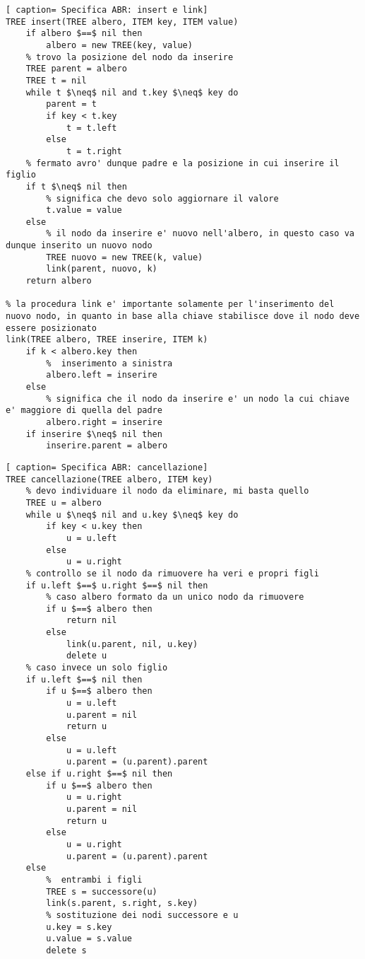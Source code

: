 \documentclass[../cheatSheetAlgoritmi.tex]{subfiles}
\begin{document}
\begin{lstlisting}[ caption= Specifica ABR: insert e link]
TREE insert(TREE albero, ITEM key, ITEM value)
	if albero $==$ nil then
		albero = new TREE(key, value)
	% trovo la posizione del nodo da inserire
	TREE parent = albero
	TREE t = nil
	while t $\neq$ nil and t.key $\neq$ key do
	  	parent = t
		if key < t.key
    		t = t.left
		else 
			t = t.right
	% fermato avro' dunque padre e la posizione in cui inserire il figlio
	if t $\neq$ nil then
		% significa che devo solo aggiornare il valore
		t.value = value
	else
		% il nodo da inserire e' nuovo nell'albero, in questo caso va dunque inserito un nuovo nodo
		TREE nuovo = new TREE(k, value)
		link(parent, nuovo, k)
	return albero

% la procedura link e' importante solamente per l'inserimento del nuovo nodo, in quanto in base alla chiave stabilisce dove il nodo deve essere posizionato
link(TREE albero, TREE inserire, ITEM k)
	if k < albero.key then
		%  inserimento a sinistra
		albero.left = inserire
	else
		% significa che il nodo da inserire e' un nodo la cui chiave e' maggiore di quella del padre
		albero.right = inserire
	if inserire $\neq$ nil then
		inserire.parent = albero
\end{lstlisting}

\begin{lstlisting}[ caption= Specifica ABR: cancellazione]
TREE cancellazione(TREE albero, ITEM key)
	% devo individuare il nodo da eliminare, mi basta quello
	TREE u = albero
	while u $\neq$ nil and u.key $\neq$ key do
		if key < u.key then
			u = u.left
		else
			u = u.right
	% controllo se il nodo da rimuovere ha veri e propri figli
	if u.left $==$ u.right $==$ nil then
		% caso albero formato da un unico nodo da rimuovere
		if u $==$ albero then
			return nil
		else
			link(u.parent, nil, u.key)
			delete u
	% caso invece un solo figlio
	if u.left $==$ nil then 
		if u $==$ albero then 
			u = u.left
			u.parent = nil
			return u
		else
			u = u.left
			u.parent = (u.parent).parent
	else if u.right $==$ nil then 
		if u $==$ albero then 
			u = u.right
			u.parent = nil
			return u
		else
			u = u.right
			u.parent = (u.parent).parent
	else 
		%  entrambi i figli
		TREE s = successore(u)
		link(s.parent, s.right, s.key)
		% sostituzione dei nodi successore e u
		u.key = s.key
		u.value = s.value
		delete s
\end{lstlisting}
\end{document}
